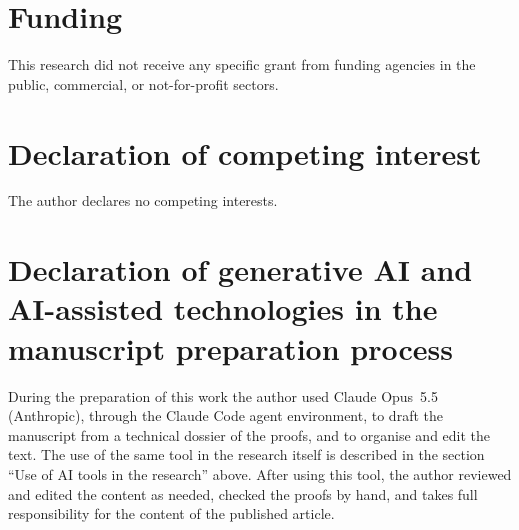 \documentclass[preprint,11pt]{elsarticle}
\theoremstyle{definition}
\theoremstyle{remark}
\numberwithin{equation}{section}
\begin{document}
\section*{Funding}
This research did not receive any specific grant from funding agencies in the public,
commercial, or not-for-profit sectors.

\section*{Declaration of competing interest}
The author declares no competing interests.

\section*{Declaration of generative AI and AI-assisted technologies in the manuscript preparation process}

During the preparation of this work the author used Claude Opus~5.5
(Anthropic), through the Claude Code agent environment, to draft the
manuscript from a technical dossier of the proofs, and to organise and
edit the text. The use of the same tool in the research itself is
described in the section ``Use of AI tools in the research'' above.
After using this tool, the author reviewed and edited the content as
needed, checked the proofs by hand, and takes full responsibility for the
content of the published article.




\end{document}
